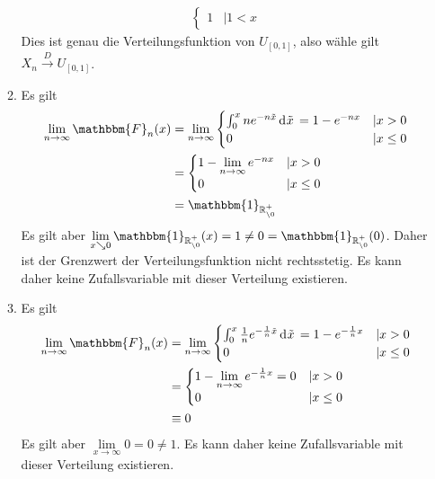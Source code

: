 \documentclass[uebung]{lecture}
\newcommand{\F}{\mathbbm{F}}
\begin{document}
\begin{aufgabe}[]
\begin{enumerate}[(a)]
\begin{enumerate}
\begin{align*}
\begin{cases}
                    1 &| 1 < x
                \end{cases}
            \end{align*}
            Dies ist genau die Verteilungsfunktion von $U_{[0,1]}$, also wähle gilt $X_n \xrightarrow{D} U_{[0,1]}$.
            \item Es gilt
            \begin{align*}
                \lim\limits_{n \to \infty} \F_n(x) &= \lim\limits_{n \to \infty} \begin{cases}
                    \int_0^x ne^{-n\tilde{x}}\d{\tilde{x}} = 1 - e^{-nx} &| x > 0\\
                    0 &| x \leq 0
                \end{cases}\\
                &= \begin{cases}
                    1 - \lim\limits_{n \to \infty} e^{-nx} &| x > 0\\
                    0&|x \leq 0
                \end{cases}\\
                &= \mathbbm{1}_{\R_{\setminus 0}^+}
            \end{align*}
            Es gilt aber $\lim\limits_{x \searrow 0} \mathbbm{1}_{\R_{\setminus 0}^+}(x) = 1 \neq 0 = \mathbbm{1}_{\R_{\setminus 0}^+}(0)$.
            Daher ist der Grenzwert der Verteilungsfunktion nicht rechtsstetig. Es kann daher keine Zufallsvariable mit dieser Verteilung
            existieren.
            \item Es gilt
            \begin{align*}
                \lim\limits_{n \to \infty} \F_n(x) &= \lim\limits_{n \to \infty} \begin{cases}
                    \int_0^x \frac{1}{n}e^{-\frac{1}{n}\tilde{x}}\d{\tilde{x}} = 1 - e^{-\frac{1}{n}x} &| x > 0\\
                    0 &| x \leq 0
                \end{cases}\\
                &= \begin{cases}
                    1 - \lim\limits_{n \to \infty} e^{-\frac{1}{n}x} = 0 &| x > 0\\
                    0&|x \leq 0
                \end{cases}\\
                &\equiv 0
            \end{align*}
            Es gilt aber $\lim\limits_{x \to \infty} 0 = 0\neq 1$. Es kann daher keine Zufallsvariable mit dieser Verteilung
            existieren.
        \end{enumerate}
    \end{enumerate}
\end{aufgabe}
\end{document}
